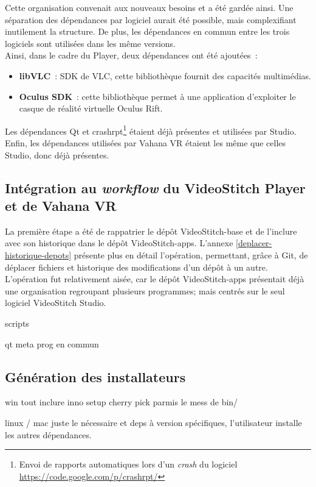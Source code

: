 Cette organisation convenait aux nouveaux besoins et a été gardée ainsi. Une séparation
des dépendances par logiciel aurait été possible, mais complexifiant inutilement 
la structure. De plus, les dépendances en commun entre les trois logiciels
sont utilisées dans les même versions. \\
\newline
Ainsi, dans le cadre du Player, deux dépendances ont été ajoutées~:
\begin{itemize}
  \item \textbf{libVLC}~: SDK de VLC, cette bibliothèque fournit des capacités multimédias.\cite{libvlc}
  \item \textbf{Oculus SDK}~: cette bibliothèque permet à une application d'exploiter le 
  casque de réalité virtuelle Oculus Rift.\cite{oculus-developer-guide}
\end{itemize}
Les dépendances Qt et crashrpt\footnote{Envoi de rapports automatiques lors d'un
\textit{crash} du logiciel \url{https://code.google.com/p/crashrpt/}} étaient déjà 
présentes et utilisées par Studio.\\
Enfin, les dépendances utilisées par Vahana VR étaient les même que celles Studio,
donc déjà présentes.

\subsection{Intégration au \textit{workflow} du VideoStitch Player et de Vahana VR}
La première étape a été de rappatrier le dépôt VideoStitch-base et de l'inclure
avec son historique dans le dépôt VideoStitch-apps. L'annexe \ref{deplacer-historique-depots}
présente plus en détail l'opération, permettant, grâce à Git, de déplacer fichiers
et historique des modifications d'un dépôt à un autre.\\
\newline
L'opération fut relativement aisée, car le dépôt VideoStitch-apps présentait déjà
une organisation regroupant plusieurs programmes; mais centrés sur le seul logiciel
VideoStitch Studio.

scripts

qt meta prog en commun

\subsection{Génération des installateurs}
win tout inclure inno setup cherry pick parmis le mess de bin/

linux / mac juste le nécessaire et deps à version spécifiques, l'utilisateur
installe les autres dépendances.

